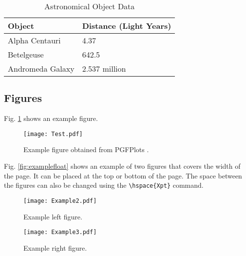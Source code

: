 \documentclass[9pt,a4paper,twocolumn,twoside]{tau-class/tau}
\begin{document}
        \begin{table}[H]
            \centering
            \caption{Astronomical Object Data}
            \label{tab:table}
            \begin{tabular}{ll}
                \toprule
                \textbf{Object} & \textbf{Distance (Light Years)} \\
                \midrule
                Alpha Centauri & 4.37 \\
                Betelgeuse & 642.5 \\
                Andromeda Galaxy & 2.537 million \\
                \bottomrule   
            \end{tabular}
			
			
        \end{table}

    \subsection{Figures}
		
    	Fig. \ref{fig:figure} shows an example figure.
    		
    	\begin{figure}[H]
    		\centering
    		\texttt{[image: Test.pdf]}
    		\caption{Example figure obtained from PGFPlots \cite{PFGPlots}.}
    		\label{fig:figure}
    	\end{figure}
		
        Fig. \ref{fig:examplefloat} shows an example of two figures that covers the width of the page. It can be placed at the top or bottom of the page. The space between the figures can also be changed using the \verb|\hspace{Xpt}| command.
		
        \begin{figure*}[tp] %
		\centering
		  \begin{subfigure}[b]{0.38\linewidth} %
			\texttt{[image: Example2.pdf]}
			\caption{Example left figure.}
			\label{fig:figa}
		\end{subfigure}
			\hspace{20pt}   %
		\begin{subfigure}[b]{0.375\linewidth} %
			\texttt{[image: Example3.pdf]}
			\caption{Example right figure.}
			\label{fig:figb}
		\end{subfigure}
		\caption{Example figure that covers the width of the page obtained from PGFPlots \cite{PFGPlots}.}
		\label{fig:examplefloat}
	\end{figure*}
		
\end{document}
